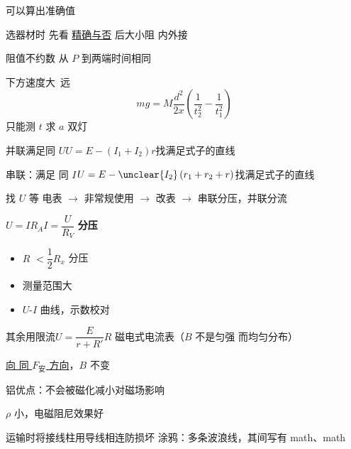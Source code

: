 可以算出准确值 %

选器材时 先看 \underline{精确与否} 后大小阻 内外接 %

阻值不约数 %
从 $P$ 到两端时间相同

下方速度大\ 远
\[
mg=M\frac{d^2}{2x}\left(\frac{1}{t_2^2}-\frac{1}{t_1^2}\right)
\]
只能测 $t$ 求 $a$
双灯

并联\quad 满足同 $U$\quad $U=E-(I_1+I_2)r$\quad 找满足式子的直线

串联\quad ：满足 同 $I$\quad $U=E-\unclear{I_2}\,(r_1+r_2+r)$\quad 找满足式子的直线

找 $U$ 等 %
电表 $\to$ 非常规使用 $\to$ 改表 $\to$ 串联分压，并联分流

$U=IR_A$\quad $I=\dfrac{U}{R_V}$
\textbf{分压}
\begin{itemize}
\item $R$ $<\dfrac{1}{2}R_x$ 分压
\item 测量范围大
\item $U$-$I$ 曲线，示数校对 %
\end{itemize}
其余用限流\qquad $U=\dfrac{E}{r+R'}R$
磁电式电流表（$B$ 不是匀强 而均匀分布）

\underline{向 同 $F_{\text{安}}$ 方向}，$B$ 不变

铝优点：不会被磁化\quad 减小对磁场影响

$\rho$ 小，电磁阻尼效果好 %

运输时将接线柱用导线相连防损坏 %
涂鸦：多条波浪线，其间写有 math、math
